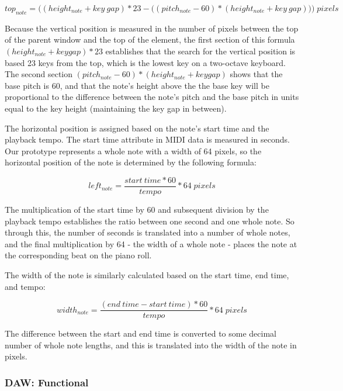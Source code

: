 \begin{equation} \label{note_vert}
  top_{note} = \Big((height_{note} + key\:gap) * 23 - \big((pitch_{note} -  60) * (height_{note} + key\:gap)\big)\Big)\;pixels
\end{equation}

Because the vertical position is measured in the number of pixels between the top of the parent
window and the top of the element, the first section of this formula $ (height_{note} + keygap) * 23 $
establishes that the search for the vertical position is based 23 keys from the top, which is
the lowest key on a two-octave keyboard. The second section $ (pitch_{note} -  60) * (height_{note} + keygap) $
shows that the base pitch is 60, and that the note's height above the the base key will be
proportional to the difference between the note's pitch and the base pitch in units equal to the
key height (maintaining the key gap in between).

The horizontal position is assigned based on the note's start time and the playback tempo. The
start time attribute in MIDI data is measured in seconds. Our prototype represents a whole note
with a width of 64 pixels, so the horizontal position of the note is determined by the following
formula:

\begin{equation} \label{note_vert}
  left_{note} = \frac{start\:time * 60}{tempo} * 64\;pixels
\end{equation}

The multiplication of the start time by 60 and subsequent division by the playback tempo
establishes the ratio between one second and one whole note. So through this, the number of
seconds is translated into a number of whole notes, and the final multiplication by 64 - the width
of a whole note - places the note at the corresponding beat on the piano roll.

The width of the note is similarly calculated based on the start time, end time, and tempo:

\begin{equation} \label{note_vert}
  width_{note} = \frac{(end\:time - start\:time) * 60}{tempo} * 64\;pixels
\end{equation}

The difference between the start and end time is converted to some decimal number of whole note
lengths, and this is translated into the width of the note in pixels.

\subsubsection{DAW: Functional}

